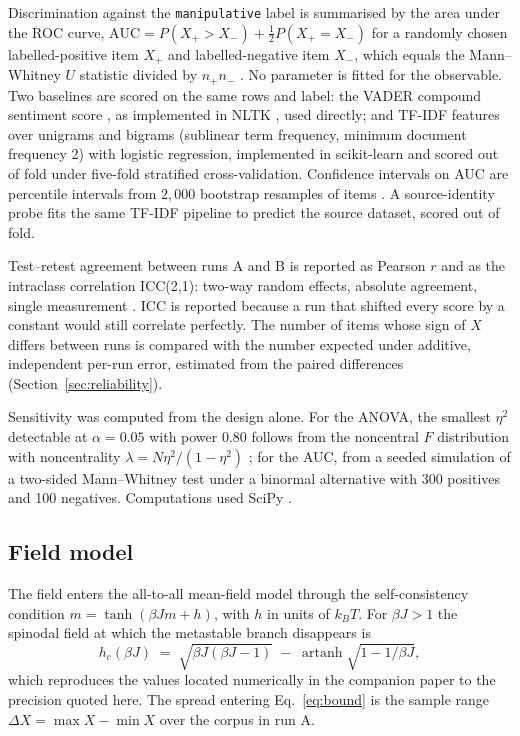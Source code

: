 \documentclass[preprint,12pt]{elsarticle}
\begin{document}
Discrimination against the \texttt{manipulative} label is summarised by the area under the
ROC curve, $\mathrm{AUC} = P(X_+ > X_-) + \tfrac12 P(X_+ = X_-)$ for a randomly chosen
labelled-positive item $X_+$ and labelled-negative item $X_-$, which equals the Mann--Whitney
$U$ statistic divided by $n_+ n_-$ \cite{hanley1982,mann1947}. No parameter is fitted for
the observable. Two baselines are scored on the same rows and label: the VADER compound
sentiment score \cite{hutto2014}, as implemented in NLTK \cite{bird2009}, used directly; and
TF-IDF features over unigrams and bigrams (sublinear term frequency, minimum document
frequency 2) with logistic regression, implemented in scikit-learn \cite{pedregosa2011} and
scored out of fold under five-fold stratified cross-validation. Confidence intervals on AUC
are percentile intervals from $2{,}000$ bootstrap resamples of items \cite{efron1993}. A
source-identity probe fits the same TF-IDF pipeline to predict the source dataset, scored
out of fold.

Test--retest agreement between runs A and B is reported as Pearson $r$ and as the
intraclass correlation ICC(2,1): two-way random effects, absolute agreement, single
measurement \cite{shrout1979,mcgraw1996}. ICC is reported because a run that shifted every
score by a constant would still correlate perfectly. The number of items whose sign of $X$
differs between runs is compared with the number expected under additive, independent
per-run error, estimated from the paired differences (Section~\ref{sec:reliability}).

Sensitivity was computed from the design alone. For the ANOVA, the smallest $\eta^2$
detectable at $\alpha = 0.05$ with power $0.80$ follows from the noncentral $F$
distribution with noncentrality $\lambda = N\eta^2/(1-\eta^2)$ \cite{cohen1988}; for the AUC,
from a seeded simulation of a two-sided Mann--Whitney test under a binormal alternative with
300 positives and 100 negatives. Computations used SciPy \cite{virtanen2020}.

\subsection{Field model}
\label{sec:model}

The field enters the all-to-all mean-field model through the self-consistency condition
$m = \tanh(\beta J m + h)$, with $h$ in units of $k_B T$. For $\beta J > 1$ the spinodal field
at which the metastable branch disappears is
\begin{equation}
\label{eq:hc}
h_c(\beta J) \;=\; \sqrt{\beta J(\beta J - 1)} \;-\; \operatorname{artanh}\!\sqrt{1 - 1/\beta J},
\end{equation}
which reproduces the values located numerically in the companion paper \cite{mwai_bound} to
the precision quoted here. The spread entering Eq.~\eqref{eq:bound} is the sample range
$\Delta X = \max X - \min X$ over the corpus in run A.
\end{document}
